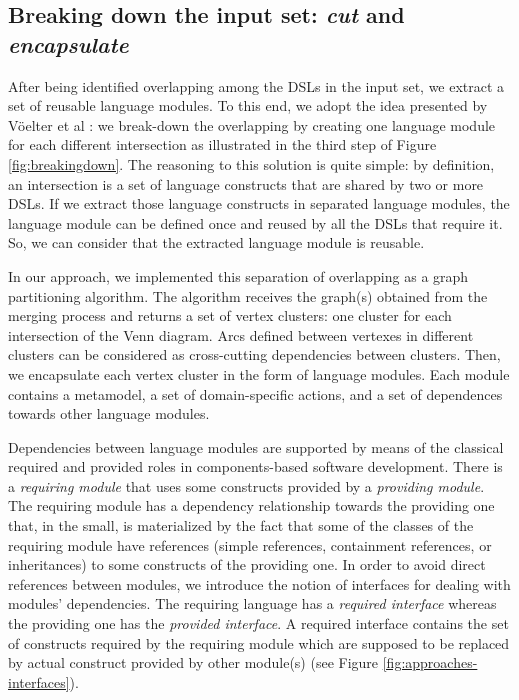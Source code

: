 \subsection{Breaking down the input set: \textit{cut} and \textit{encapsulate}}

After being identified overlapping among the DSLs in the input set, we extract a set of reusable language modules. To this end, we adopt the idea presented by V\"oelter et al \cite[p. 60-61]{voelter:2013}: we break-down the overlapping by creating one language module for each different intersection as illustrated in the third step of Figure \ref{fig:breakingdown}. The reasoning to this solution is quite simple: by definition, an intersection is a set of language constructs that are shared by two or more DSLs. If we extract those language constructs in separated language modules, the language module can be defined once and reused by all the DSLs that require it. So, we can consider that the extracted language module is reusable. 

In our approach, we implemented this separation of overlapping as a graph partitioning algorithm. The algorithm receives the graph(s) obtained from the merging process and returns a set of vertex clusters: one cluster for each intersection of the Venn diagram. Arcs defined between vertexes in different clusters can be considered as cross-cutting dependencies between clusters. Then, we encapsulate each vertex cluster in the form of language modules. Each module contains a metamodel, a set of domain-specific actions, and a set of dependences towards other language modules. 

Dependencies between language modules are supported by means of the classical required and provided roles in components-based software development. There is a \textit{requiring module} that uses some constructs provided by a \textit{providing module}. The requiring module has a dependency relationship towards the providing one that, in the small, is materialized by the fact that some of the classes of the requiring module have references (simple references, containment references, or inheritances) to some constructs of the providing one. In order to avoid direct references between modules, we introduce the notion of interfaces for dealing with modules' dependencies. The requiring language has a \textit{required interface} whereas the providing one has the \textit{provided interface}. A required interface contains the set of constructs required by the requiring module which are supposed to be replaced by actual construct provided by other module(s) (see Figure \ref{fig:approaches-interfaces}).

